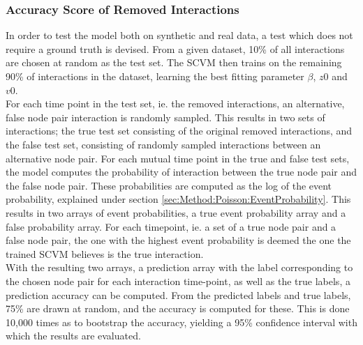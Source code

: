 \subsubsection{Accuracy Score of Removed Interactions}
\label{sec:Method:Evaluation:AUC}
In order to test the model both on synthetic and real data, a test which does not require a ground truth is devised.
From a given dataset, 10\% of all interactions are chosen at random as the test set.
The SCVM then trains on the remaining 90\% of interactions in the dataset, learning the best fitting parameter $\beta$, $z0$ and $v0$.
\\
For each time point in the test set, ie. the removed interactions, an alternative, false node pair interaction is randomly sampled.
This results in two sets of interactions; the true test set consisting of the original removed interactions, and the false test set, consisting of randomly sampled interactions between an alternative node pair.
For each mutual time point in the true and false test sets, the model computes the probability of interaction between the true node pair and the false node pair.
These probabilities are computed as the log of the event probability, explained under section \ref{sec:Method:Poisson:EventProbability}.
This results in two arrays of event probabilities, a true event probability array and a false probability array.
For each timepoint, ie. a set of a true node pair and a false node pair, the one with the highest event probability is deemed the one the trained SCVM believes is the true interaction.
\\
With the resulting two arrays, a prediction array with the label corresponding to the chosen node pair for each interaction time-point, as well as the true labels, a prediction accuracy can be computed.
From the predicted labels and true labels, 75\% are drawn at random, and the accuracy is computed for these.
This is done 10,000 times as to bootstrap the accuracy, yielding a 95\% confidence interval with which the results are evaluated.



